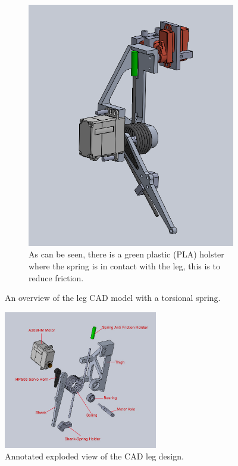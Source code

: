 \begin{figure}[h!]
\begin{subfigure}[b]{0.45\textwidth}
        \includegraphics[width=\textwidth]{Images/CAD_leg_outside_bent.png}
        \caption{As can be seen, there is a green plastic (PLA) holster where the spring is in contact with the leg, this is to reduce  friction.}
        \label{fig:image2}
    \end{subfigure}
    \caption{An overview of the leg CAD model with a torsional spring. }
    \label{fig:assembly_CAD}
\end{figure}

\begin{figure}[h!]
    \centering
    \includegraphics[width=0.6\textwidth]{Images/CAD_leg_exploded_annotate.png}
    \caption{Annotated exploded view of the CAD leg design.}
    \label{fig:CAD_leg_exploded_annotate}
\end{figure}

